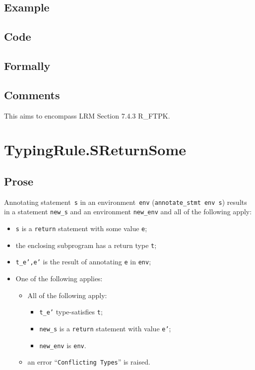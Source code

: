 \documentclass{book}
\begin{document}
  \subsection{Example}

  \subsection{Code}

\begin{emptyformal}
    \subsection{Formally}
\end{emptyformal}

\subsection{Comments}
    This aims to encompass LRM Section 7.4.3 R\_FTPK.
    
\section{TypingRule.SReturnSome \label{sec:TypingRule.SReturnSome}}

  \subsection{Prose}
Annotating statement~\texttt{s} in an environment~\texttt{env}
(\texttt{annotate\_stmt env s}) results in a statement \texttt{new\_s} and an
environment \texttt{new\_env} and all of the following apply:
   \begin{itemize}
   \item \texttt{s} is a \texttt{return} statement with some value \texttt{e};
   \item the enclosing subprogram has a return type \texttt{t};
   \item \texttt{t\_e',e'} is the result of annotating \texttt{e} in \texttt{env};
   \item One of the following applies:
     \begin{itemize}
     \item All of the following apply:
       \begin{itemize}
       \item \texttt{t\_e'} type-satisfies \texttt{t};
       \item \texttt{new\_s} is a \texttt{return} statement with value \texttt{e'};
       \item \texttt{new\_env} is \texttt{env}. 
       \end{itemize}
     \item an error ``\texttt{Conflicting Types}'' is raised.
     \end{itemize}
   \end{itemize}
\end{document}
